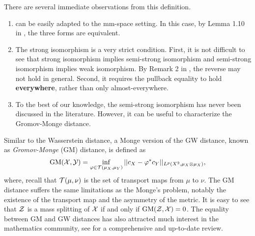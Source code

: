 There are several immediate observations from this definition.
\begin{enumerate}
  \item {} can be easily adapted to the mm-space setting. In this case,
  by Lemma 1.10 in \citep{Sturm12}, the three forms are equivalent.

  \item The strong isomorphism is a very strict condition. First,
  it is not difficult to see that strong isomorphism implies semi-strong isomorphism and
  semi-strong isomorphism implies weak isomorphism. By Remark 2 in \citep{Chowdhury19},
  the reverse may not hold in general. Second, it requires the pullback equality to hold
  \textbf{everywhere}, rather than only almost-everywhere.

  \item To the best of our knowledge, the semi-strong isomorphism has never been discussed in the literature.
  However, it can be useful to characterize the Gromov-Monge distance.
\end{enumerate}
Similar to the Wasserstein distance, a Monge version of the GW distance,
known as \textit{Gromov-Monge} (GM) distance, is defined as
\begin{align}
  \text{GM}(\mathcal X, \mathcal Y) =
  \inf_{\varphi \in \mathcal T(\mu_X, \mu_Y)} || c_X - \varphi^* c_Y ||_{L^p(X^2, \mu_X \otimes \mu_X)},
\end{align}
where, recall that $\mathcal T(\mu, \nu)$ is the set of transport maps from $\mu$ to $\nu$.
The GM distance suffers the same limitations as the Monge's problem,
notably the existence of the transport map and the asymmetry of the metric.
It is easy to see that $\mathcal Z$ is a mass splitting of $\mathcal X$ if and only if $\text{GM}(\mathcal Z, \mathcal X) = 0$.
The equality between GM and GW distances has also attracted much interest
in the mathematics community, see \citep{Memoli22} for a comprehensive and up-to-date review.

